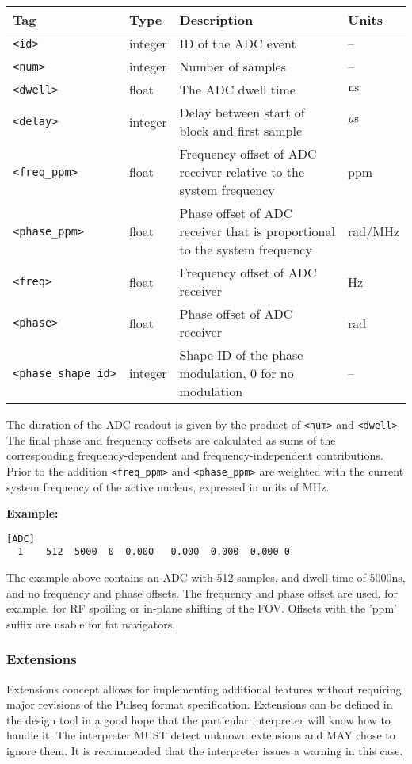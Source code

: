 \documentclass{article}
\begin{document}
\begin{tabularx}{\textwidth}{llXl}
\toprule
Tag & Type & Description & Units\\
\midrule
\verb.<id>. & integer & ID of the ADC event & -- \\
\verb.<num>. & integer & Number of samples & -- \\
\verb.<dwell>. & float & The ADC dwell time & $\rm n s$ \\
\verb.<delay>. & integer & Delay between start of block and first sample & $\rm \mu s$  \\
\verb.<freq_ppm>. & float & Frequency offset of ADC receiver relative to the system frequency & ppm \\
\verb.<phase_ppm>. & float & Phase offset of ADC receiver that is proportional to the system frequency & rad/MHz \\
\verb.<freq>. & float & Frequency offset of ADC receiver & Hz \\
\verb.<phase>. & float & Phase offset of ADC receiver & rad \\
\verb.<phase_shape_id>. & integer & Shape ID of the phase modulation, 0 for no modulation & -- \\
\bottomrule
\end{tabularx}

The duration of the ADC readout is given by the product of \verb.<num>. and \verb.<dwell>. The final phase and frequency coffsets are calculated as sums of the corresponding frequency-dependent and frequency-independent contributions. Prior to the addition \verb.<freq_ppm>. and \verb.<phase_ppm>. are weighted with the current system frequency of the active nucleus, expressed in units of MHz.

\begin{minipage}{\textwidth}
\textbf{Example:}
\begin{lstlisting}
[ADC]
  1    512  5000  0  0.000   0.000  0.000  0.000 0
\end{lstlisting}
\end{minipage}

The example above contains an ADC with 512 samples, and dwell time of 5000ns, and no frequency and phase offsets. The frequency and phase offset are used, for example, for RF spoiling or in-plane shifting of the FOV. Offsets with the 'ppm' suffix are usable for fat navigators.

\subsubsection{Extensions}
Extensions concept allows for implementing additional features without requiring major revisions of the Pulseq format specification. Extensions can be defined in the design tool in a good hope that the particular interpreter will know how to handle it. The interpreter MUST detect unknown extensions and MAY chose to ignore them. It is recommended that the interpreter issues a warning in this case. 
\end{document}
